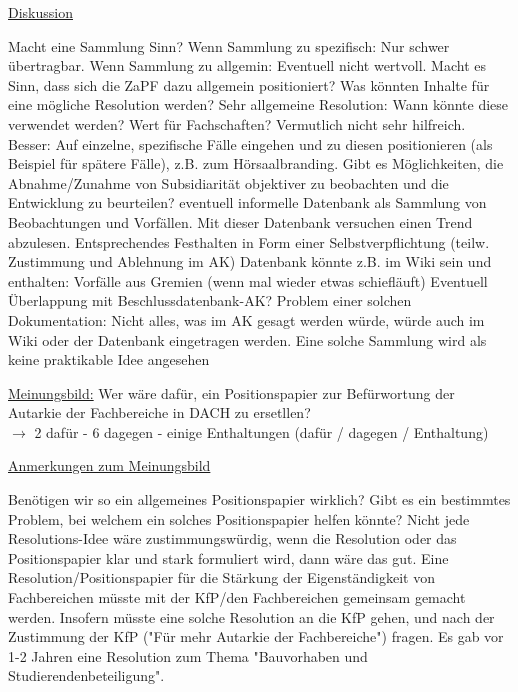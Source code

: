     \underline{Diskussion}
    \begin{outline}
      \1 Macht eine Sammlung Sinn?
        \2 Wenn Sammlung zu spezifisch: Nur schwer übertragbar.
        \2 Wenn Sammlung zu allgemin: Eventuell nicht wertvoll.
      \1 Macht es Sinn, dass sich die ZaPF dazu allgemein positioniert?
      \1 Was könnten Inhalte für eine mögliche Resolution werden?
        \2 Sehr allgemeine Resolution: Wann könnte diese verwendet werden? Wert für Fachschaften? Vermutlich nicht sehr hilfreich. Besser: Auf einzelne, spezifische Fälle eingehen und zu diesen positionieren (als Beispiel für spätere Fälle), z.B. zum Hörsaalbranding.
      \1 Gibt es Möglichkeiten, die Abnahme/Zunahme von Subsidiarität objektiver zu beobachten und die Entwicklung zu beurteilen?
      eventuell informelle Datenbank als Sammlung von Beobachtungen und Vorfällen. Mit dieser Datenbank versuchen einen Trend abzulesen.
        \2 Entsprechendes Festhalten in Form einer Selbstverpflichtung (teilw. Zustimmung und Ablehnung im AK)
        \2 Datenbank könnte z.B. im Wiki sein und enthalten:
          \3 Vorfälle aus Gremien (wenn mal wieder etwas schiefläuft)
        \2 Eventuell Überlappung mit Beschlussdatenbank-AK?
        \2 Problem einer solchen Dokumentation: Nicht alles, was im AK gesagt werden würde, würde auch im Wiki oder der Datenbank eingetragen werden.
        \2 Eine solche Sammlung wird als keine praktikable Idee angesehen
    \end{outline}
    \underline{Meinungsbild:} Wer wäre dafür, ein Positionspapier zur Befürwortung der Autarkie der Fachbereiche in DACH zu ersetllen? \\
      $\rightarrow$ 2 dafür - 6 dagegen - einige Enthaltungen (dafür / dagegen / Enthaltung)

    \underline{Anmerkungen zum Meinungsbild}
    \begin{outline}
      \1 Benötigen wir so ein allgemeines Positionspapier wirklich?
      \1 Gibt es ein bestimmtes Problem, bei welchem ein solches Positionspapier helfen könnte?
      \1 Nicht jede Resolutions-Idee wäre zustimmungswürdig, wenn die Resolution oder das Positionspapier klar und stark formuliert wird, dann wäre das gut.
      \1 Eine Resolution/Positionspapier für die Stärkung der Eigenständigkeit von Fachbereichen müsste mit der KfP/den Fachbereichen gemeinsam gemacht werden. Insofern müsste eine solche Resolution an die KfP gehen, und nach der Zustimmung der KfP ("Für mehr Autarkie der Fachbereiche") fragen.
      \1 Es gab vor 1-2 Jahren eine Resolution zum Thema "Bauvorhaben und Studierendenbeteiligung".
    \end{outline}

